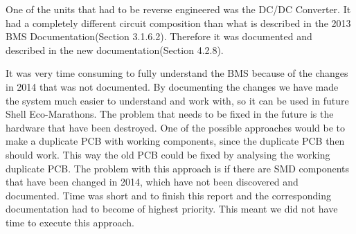 One of the units that had to be reverse engineered was the DC/DC Converter. It had a completely different circuit composition than what is described in the 2013 BMS Documentation\cite{BMSDocumentation}(Section 3.1.6.2). Therefore it was documented and described in the new documentation\cite{AU2}(Section 4.2.8). 

It was very time consuming to fully understand the BMS because of the changes in 2014 that was not documented. By documenting the changes we have made the system much easier to understand and work with, so it can be used in future Shell Eco-Marathons. The problem that needs to be fixed in the future is the hardware that have been destroyed. One of the possible approaches would be to make a duplicate PCB with working components, since the duplicate PCB then should work. This way the old PCB could be fixed by analysing the working duplicate PCB. The problem with this approach is if there are SMD components that have been changed in 2014, which have not been discovered and documented. Time was short and to finish this report and the corresponding documentation had to become of highest priority. This meant we did not have time to execute this approach.
